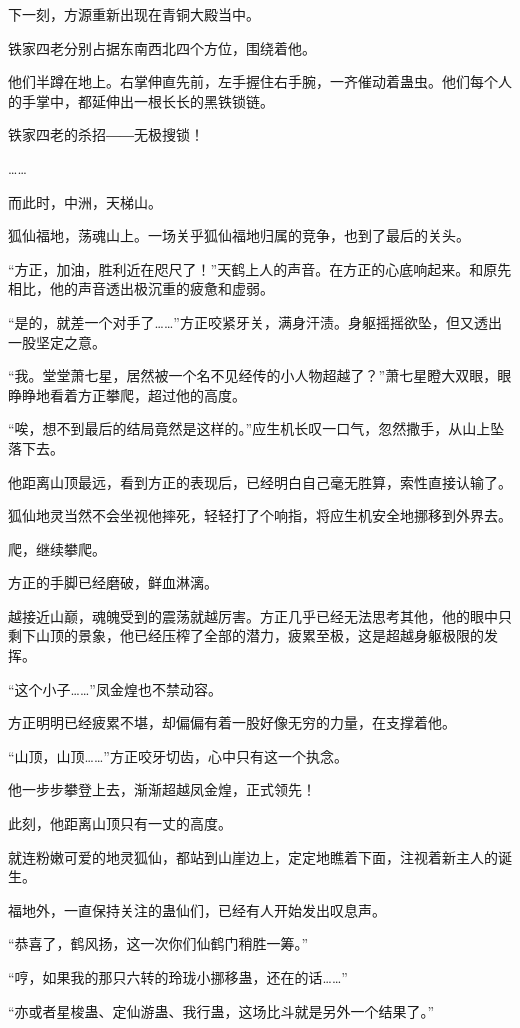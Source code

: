 \begin{this_body}
下一刻，方源重新出现在青铜大殿当中。

铁家四老分别占据东南西北四个方位，围绕着他。

他们半蹲在地上。右掌伸直先前，左手握住右手腕，一齐催动着蛊虫。他们每个人的手掌中，都延伸出一根长长的黑铁锁链。

铁家四老的杀招――无极搜锁！

……

而此时，中洲，天梯山。

狐仙福地，荡魂山上。一场关乎狐仙福地归属的竞争，也到了最后的关头。

“方正，加油，胜利近在咫尺了！”天鹤上人的声音。在方正的心底响起来。和原先相比，他的声音透出极沉重的疲惫和虚弱。

“是的，就差一个对手了……”方正咬紧牙关，满身汗渍。身躯摇摇欲坠，但又透出一股坚定之意。

“我。堂堂萧七星，居然被一个名不见经传的小人物超越了？”萧七星瞪大双眼，眼睁睁地看着方正攀爬，超过他的高度。

“唉，想不到最后的结局竟然是这样的。”应生机长叹一口气，忽然撒手，从山上坠落下去。

他距离山顶最远，看到方正的表现后，已经明白自己毫无胜算，索性直接认输了。

狐仙地灵当然不会坐视他摔死，轻轻打了个响指，将应生机安全地挪移到外界去。

爬，继续攀爬。

方正的手脚已经磨破，鲜血淋漓。

越接近山巅，魂魄受到的震荡就越厉害。方正几乎已经无法思考其他，他的眼中只剩下山顶的景象，他已经压榨了全部的潜力，疲累至极，这是超越身躯极限的发挥。

“这个小子……”凤金煌也不禁动容。

方正明明已经疲累不堪，却偏偏有着一股好像无穷的力量，在支撑着他。

“山顶，山顶……”方正咬牙切齿，心中只有这一个执念。

他一步步攀登上去，渐渐超越凤金煌，正式领先！

此刻，他距离山顶只有一丈的高度。

就连粉嫩可爱的地灵狐仙，都站到山崖边上，定定地瞧着下面，注视着新主人的诞生。

福地外，一直保持关注的蛊仙们，已经有人开始发出叹息声。

“恭喜了，鹤风扬，这一次你们仙鹤门稍胜一筹。”

“哼，如果我的那只六转的玲珑小挪移蛊，还在的话……”

“亦或者星梭蛊、定仙游蛊、我行蛊，这场比斗就是另外一个结果了。”


\end{this_body}
